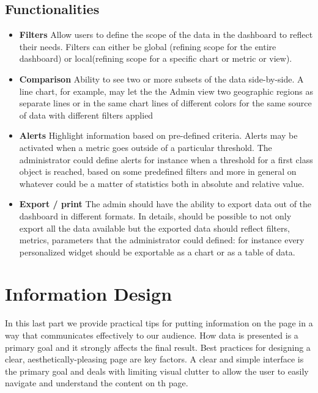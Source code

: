 \documentclass[a4paper,13pt]{report}
\begin{document}
\subsection{Functionalities}
\begin{itemize}
\item \textbf{Filters}\newline
Allow users to define the scope of the data in the dashboard to reflect their needs. Filters can either be global (refining scope for the entire dashboard) or local(refining scope for a specific chart or metric or view).

\item \textbf{Comparison}\newline
Ability to see two or more subsets of the data side-by-side. A line chart, for example, may let the the Admin view two geographic regions as separate lines or in the same chart lines of different colors for the same source of data with different filters applied

\item \textbf{Alerts}\newline
Highlight information based on pre-defined criteria. Alerts may be activated when a metric goes outside of a particular threshold.  The administrator could define alerts for instance when a threshold for a first class object is reached, based on some predefined filters and more in general on whatever could be a matter of statistics both in absolute and relative value.

\item \textbf{Export / print}\newline
The  admin should have the ability to export data out of the dashboard in different formats. In details, should be possible to not only export all the data available but the exported data should reflect filters, metrics, parameters that the administrator could defined: for instance every personalized widget should be exportable as a chart or as a table of data.
\end{itemize}

\section{Information Design}
In this last part we provide practical tips for putting information on the page in a way that communicates effectively to our audience. How data is presented is a primary goal and it strongly affects the final result. Best practices for designing a clear, aesthetically-pleasing page are key factors.\newline
A clear and simple interface is the primary goal and deals with limiting visual clutter to allow the user to easily navigate and understand the content on th page.
\end{document}
